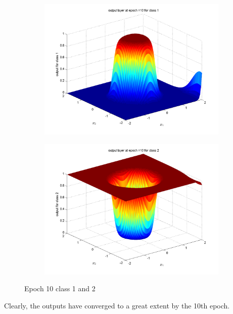 \documentclass{article}
\begin{document}
\begin{figure}
\begin{subfigure}{.5\textwidth}
  \centering
  \includegraphics[width=.8\linewidth]{Classification/nonlinearlySeparable/10_1}
 
\end{subfigure}%
\begin{subfigure}{.5\textwidth}
  \centering
  \includegraphics[width=.8\linewidth]{Classification/nonlinearlySeparable/10_2}
  
\end{subfigure}
\caption{Epoch 10 class 1 and 2}
\end{figure}
Clearly, the outputs have converged to a great extent by the 10th epoch.
\newpage
\end{document}
